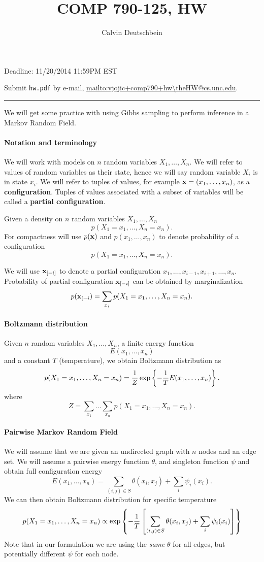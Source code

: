 \documentclass{article}
\begin{document}
\author{Calvin Deutschbein}
\setcounter{HW}{3}
\title{COMP  790-125, HW\theHW}
\maketitle

{ Deadline: 11/20/2014 11:59PM EST}

{ Submit \texttt{hw\theHW.pdf} by e-mail,  \url{mailto:vjojic+comp790+hw\theHW@cs.unc.edu}}.


\noindent\rule{\textwidth}{3pt}
We will get some practice with using Gibbs sampling to perform inference in a Markov Random Field.

\paragraph{Notation and terminology} We will work with models on $n$ random variables $X_1,\dots,X_n$.
We will refer to values of random variables as their state, hence we will say random variable $X_i$ is in state $x_i$.
We will refer to tuples of values, for example $\mathbf{x} = (x_1,\dots,x_n)$,  as a {\bf configuration}.
Tuples of values associated with a subset of variables will be called a {\bf partial configuration}.

Given a density on $n$ random variables $X_1,\dots,X_n$
\[
p(X_1 = x_1,\dots,X_n = x_n).
\]
For compactness will use $p(\mathbf{x})$ and $p(x_1,\dots,x_n)$ to denote probability of a configuration
\[
p(X_1 = x_1,\dots,X_n = x_n).
\]

We will use $\mathbf{x}_{[-i]}$ to denote a partial configuration $x_1,\dots,x_{i-1},x_{i+1},\dots,x_n$.
Probability of partial configuration $\mathbf{x}_{[-i]}$ can be obtained by marginalization
\[
p(\mathbf{x}_{[-i}) = \sum_{x_i} p(X_1 = x_1,\dots,X_n = x_n).
\]


\paragraph{Boltzmann distribution} Given $n$ random variables $X_1,\dots,X_n$, a finite energy function
\[
E(x_1,\dots,x_n)
\]
and a constant $T$ (temperature), we obtain Boltzmann distribution as
\[
p(X_1 = x_1,\dots,X_n = x_n) = \frac{1}{Z} \mathop{\rm exp}\left\{-\frac{1}{T} E(x_1,\dots,x_n)\right\}.
\]
where
\[
Z = \sum_{x_1}\dots\sum_{x_n} p(X_1 = x_1,\dots,X_n = x_n).
\]

\paragraph{Pairwise Markov Random Field} We will assume that we are given an undirected graph with $n$ nodes and an edge set.
We will assume a pairwise energy function $\theta$, and singleton function $\psi$ and obtain full configuration energy
\[
E(x_1,\dots,x_n) = \sum_{(i,j) \in  S} \theta(x_i,x_j) + \sum_i \psi_i(x_i).
\]
We can then obtain Boltzmann distribution for specific temperature
\[
p(X_1 = x_1,\dots,X_n = x_n) \propto \mathop{\rm exp}\left\{-\frac{1}{T}\left[ \sum_{(i,j) \in  S} \theta(x_i,x_j) + \sum_i \psi_i(x_i)\right]\right\}
\]
Note that in our formulation we are using the {\em same} $\theta$ for all edges, but potentially different $\psi$ for each node.
\end{document}
